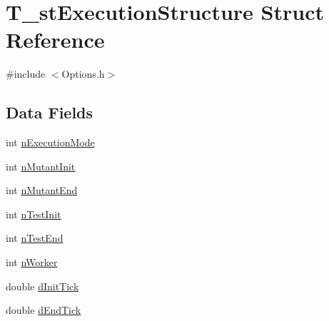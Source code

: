 \hypertarget{structT__stExecutionStructure}{\section{T\-\_\-st\-Execution\-Structure Struct Reference}
\label{structT__stExecutionStructure}
}


{\ttfamily \#include $<$Options.\-h$>$}

\subsection*{Data Fields}
\begin{DoxyCompactItemize}
\item 
int \hyperlink{structT__stExecutionStructure_aef62b95163de1f8dccbcc472c5687b90}{n\-Execution\-Mode}
\item 
int \hyperlink{structT__stExecutionStructure_aba815b781854b96b556e84b8bb358416}{n\-Mutant\-Init}
\item 
int \hyperlink{structT__stExecutionStructure_ac8fa3f0a4ca72cbd1882426f33574d5c}{n\-Mutant\-End}
\item 
int \hyperlink{structT__stExecutionStructure_adf3335889b33fa5d5137b5f0b1d2dce2}{n\-Test\-Init}
\item 
int \hyperlink{structT__stExecutionStructure_a36d89b987dd32ba06e929a5c4864c669}{n\-Test\-End}
\item 
int \hyperlink{structT__stExecutionStructure_aba070c3809e1154cba64086680fd19d9}{n\-Worker}
\item 
double \hyperlink{structT__stExecutionStructure_ac9ceb6b2fe0fb765aa705b36c2f1faf4}{d\-Init\-Tick}
\item 
double \hyperlink{structT__stExecutionStructure_a27f42d7873e49f8ae89d6c63969ef10f}{d\-End\-Tick}
\end{DoxyCompactItemize}


